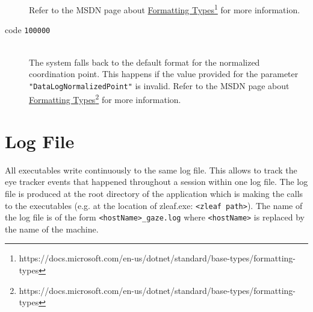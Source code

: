 \documentclass[a4paper,oneside]{book}
\begin{document}
\begin{description}
        Refer to the MSDN page about \href{https://docs.microsoft.com/en-us/dotnet/standard/base-types/formatting-types}{Formatting Types}\footnote{https://docs.microsoft.com/en-us/dotnet/standard/base-types/formatting-types} for more information.
    \item[code \texttt{100000}] \hfill \\
        The system falls back to the default format for the normalized coordination point.
        This happens if the value provided for the parameter \texttt{"DataLogNormalizedPoint"} is invalid.
        Refer to the MSDN page about \href{https://docs.microsoft.com/en-us/dotnet/standard/base-types/formatting-types}{Formatting Types}\footnote{https://docs.microsoft.com/en-us/dotnet/standard/base-types/formatting-types} for more information.
\end{description}

\section{Log File}
All executables write continuously to the same log file.
This allows to track the eye tracker events that happened throughout a session within one log file.
The log file is produced at the root directory of the application which is making the calls to the executables (e.g. at the location of zleaf.exe: \texttt{<zleaf path>}).
The name of the log file is of the form \texttt{<hostName>\_gaze.log} where \texttt{<hostName>} is replaced by the name of the machine.
\end{document}
